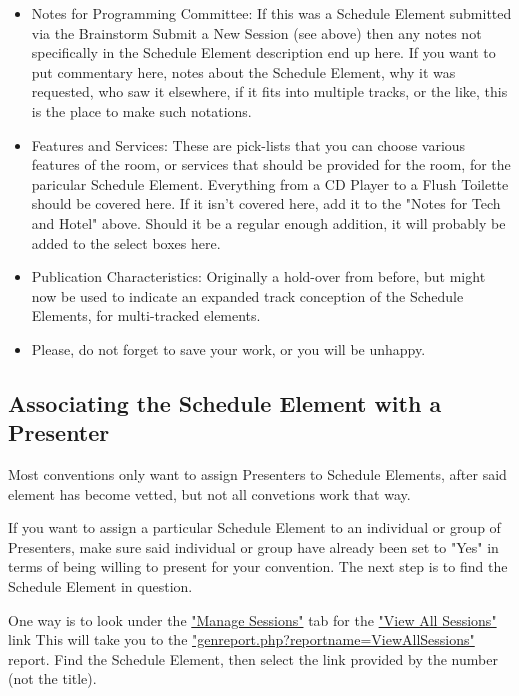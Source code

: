 \documentclass[captions=tablesignature]{scrartcl}
\begin{document}
\begin{itemize}
\item Notes for Programming Committee: If this was a Schedule Element
submitted via the Brainstorm Submit a New Session (see above) then
any notes not specifically in the Schedule Element description
end up here.  If you want to put commentary here, notes about the
Schedule Element, why it was requested, who saw it elsewhere, if
it fits into multiple tracks, or the like, this is the place to
make such notations.

\item Features and Services: These are pick-lists that you can choose
various features of the room, or services that should be provided
for the room, for the paricular Schedule Element.  Everything
from a CD Player to a Flush Toilette should be covered here.  If
it isn't covered here, add it to the "Notes for Tech and Hotel"
above. Should it be a regular enough addition, it will probably
be added to the select boxes here.

\item Publication Characteristics: Originally a hold-over from before,
but might now be used to indicate an expanded track conception of
the Schedule Elements, for multi-tracked elements.

\item Please, do not forget to save your work, or you will be unhappy.
\end{itemize}
\subsection{Associating the Schedule Element with a Presenter}
\label{sec-5-4}

Most conventions only want to assign Presenters to Schedule
Elements, after said element has become vetted, but not all
convetions work that way.

If you want to assign a particular Schedule Element to an
individual or group of Presenters, make sure said individual or
group have already been set to "Yes" in terms of being willing to
present for your convention.  The next step is to find the Schedule
Element in question.

One way is to look under the \href{../webpages/StaffManageSessions.php}{"Manage Sessions"} tab for the 
\href{../webpages/genreport.php?reportname=ViewAllSessions}{"View All Sessions"} link  This will take you to the
\href{../webpages/genreport.php?reportname=ViewAllSessions}{"genreport.php?reportname=ViewAllSessions"} report.  Find the
Schedule Element, then select the link provided by the number (not
the title).
\end{document}
